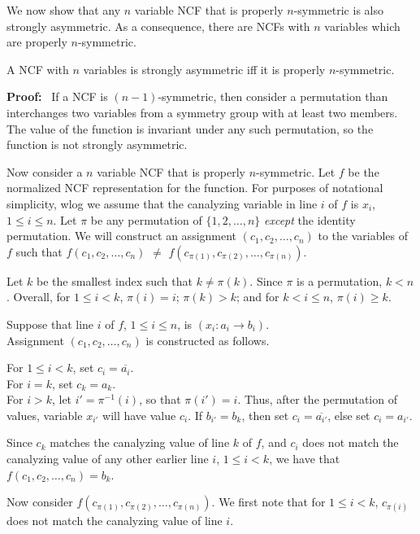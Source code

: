 We now show that any $n$ variable NCF that is properly $n$-symmetric
is also strongly asymmetric.
As a consequence, there are NCFs with $n$ variables
which are properly $n$-symmetric.

\begin{theorem}\label{thm:ncf_strong_asymmetry}
A NCF with $n$ variables is strongly asymmetric iff
it is properly $n$-symmetric.
\end{theorem}

\noindent
\textbf{Proof:}~ 
If a NCF is $(n-1)$-symmetric, then consider a permutation than
interchanges two variables from a symmetry group with at least two
members.  The value of the function is invariant under any such
permutation, so the function is not strongly asymmetric.

Now consider a $n$ variable NCF that is properly $n$-symmetric.
Let $f$ be the normalized NCF representation for the function.  For
purposes of notational simplicity, wlog we assume that the canalyzing
variable in line $i$ of $f$ is $x_i$, $1 \leq i \leq n$.  Let $\pi$
be any permutation of $\{1, 2, \ldots, n\}$ \emph{except} the
identity permutation.  We will construct an assignment $(c_1, c_2,
\ldots,  c_n)$ to the variables of $f$ such that $f(c_1, c_2, \ldots,
c_n)$ $\neq$ $f(c_{\pi(1)}, c_{\pi(2)}, \ldots, c_{\pi(n)})$.

Let $k$ be the smallest index such that $k \neq \pi(k)$.  Since
$\pi$ is a permutation, $k < n$.  Overall, for $1 \leq i < k$,
$\pi(i) = i$;
 $\pi(k) > k$; and for $k < i \leq n$, $\pi(i) \geq k$.

Suppose that line $i$ of $f$, $1 \leq i \leq n$, is \noindent $(x_i
: a_i \rightarrow b_i)$. \\ Assignment $(c_1, c_2, \ldots,  c_n)$
is constructed as follows.

\noindent
For $1 \leq i < k$, set $c_i = \overline{a_i}$. \\ For $i = k$, set
$c_k =a_k$. \\ For $i > k$, let $i' = \pi^{-1}(i)$, so that $\pi(i')
= i$.  Thus, after the permutation of values, variable $x_{i'}$
will have value $c_i$.  If $b_{i'} = b_k$, then set $c_i =
\overline{a_{i'}}$, else set $c_i =  a_{i'}$.

Since $c_k$ matches the canalyzing value of line $k$ of $f$, and
$c_i$ does not match the canalyzing value of any other earlier line
$i$, $1 \leq i < k$, we have that $f(c_1, c_2, \ldots,  c_n) = b_k$.

Now consider $f(c_{\pi(1)}, c_{\pi(2)}, \ldots, c_{\pi(n)})$.  We
first note that for $1 \leq i < k$, $c_{\pi(i)}$ does not match the
canalyzing value of line $i$.

